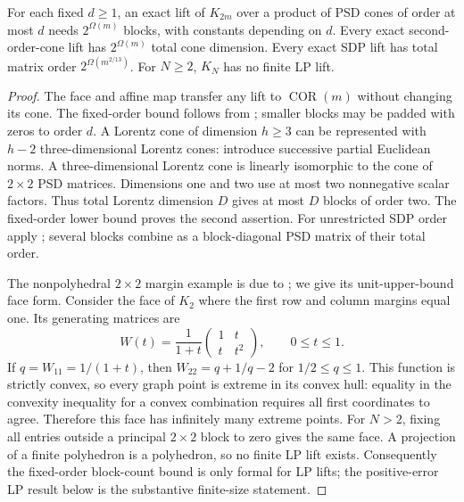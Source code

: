 \begin{corollary}\label{app:exact-conic}
For each fixed $d\ge1$, an exact lift of $K_{2m}$ over a product of
PSD cones of order at most $d$ needs $2^{\Omega(m)}$ blocks, with
constants depending on $d$. Every exact second-order-cone lift has
$2^{\Omega(m)}$ total cone dimension. Every exact SDP lift has total
matrix order $2^{\Omega(m^{2/13})}$. For $N\ge2$, $K_N$ has no finite
LP lift.
\end{corollary}
\begin{proof}
The face and affine map transfer any lift to $\operatorname{COR}(m)$
without changing its cone. The fixed-order bound follows from
\citet[Theorem~1]{s6:fawzi2013}; smaller blocks may be padded with
zeros to order $d$. A Lorentz cone of dimension $h\ge3$ can be
represented with $h-2$ three-dimensional Lorentz cones: introduce
successive partial Euclidean norms. A three-dimensional Lorentz cone
is linearly isomorphic to the cone of $2\times2$ PSD matrices.
Dimensions one and two use at most two nonnegative scalar factors.
Thus total Lorentz dimension $D$ gives at most $D$ blocks of order
two. The fixed-order lower bound proves the second assertion.
For unrestricted SDP order apply
\citet[Theorem~1.1]{s6:lrs-full}; several blocks combine as a
block-diagonal PSD matrix of their total order.

The nonpolyhedral $2\times2$ margin example is due to
\citet[Theorem~4 and Appendix~A.3, Proposition~12]
{dey2020-convexifications-of-rank-one-based}; we give its unit-upper-bound
face form. Consider the face of $K_2$ where the first row
and column margins equal one. Its generating matrices are
\[
 W(t)=\frac1{1+t}\begin{pmatrix}1&t\\t&t^2\end{pmatrix},
 \qquad 0\le t\le1.
\]
If $q=W_{11}=1/(1+t)$, then $W_{22}=q+1/q-2$ for
$1/2\le q\le1$. This function is strictly convex, so every graph
point is extreme in its convex hull: equality in the convexity
inequality for a convex combination requires all first coordinates
to agree. Therefore this face has infinitely many extreme points.
For $N>2$, fixing all entries outside a principal $2\times2$ block
to zero gives the same face. A projection of a finite polyhedron is
a polyhedron, so no finite LP lift exists. Consequently the
fixed-order block-count bound is only formal for LP lifts; the
positive-error LP result below is the substantive finite-size statement.
\end{proof}

